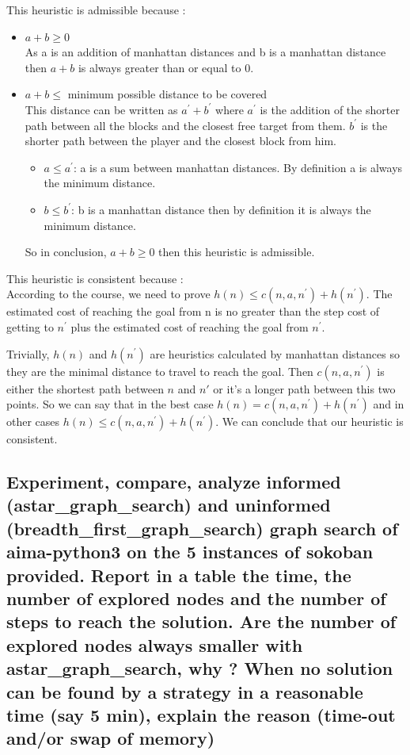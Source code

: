 \documentclass{article}
\begin{document}
This heuristic is admissible because :
\begin{itemize}
\item{$a + b \ge 0 $}\\
As a is an addition of manhattan distances and b is a manhattan distance then $a + b$ is always greater than or equal to 0.
\item{$a + b \le $ minimum possible distance to be covered}\\
This distance can be written as $a^{'} + b^{'}$ where $a^{'}$ is the addition of the shorter path between all the blocks and the closest free target from them. $b^{'}$ is the shorter path between the player and the closest block from him.
\begin{itemize}
\item{$a \le a^{'}$}: a is a sum between manhattan distances. By definition a is always the minimum distance.
\item{$b \le b^{'}$}: b is a manhattan distance then by definition it is always the minimum distance.
\end{itemize}
So in conclusion, $a + b \ge 0 $ then this heuristic is admissible. 
\end{itemize}
This heuristic is consistent because :\\
According to the course, we need to prove $h(n) \le c(n,a,n^{'}) + h(n^{'})$. The estimated cost of reaching the goal from n is no greater than the step cost of getting to $n^{'}$ plus the estimated cost of reaching the goal from $n^{'}$.

Trivially, $h(n)$ and $h(n^{'})$ are heuristics calculated by manhattan distances so they are the minimal distance to travel to reach the goal. Then $c(n,a,n^{'})$ is either the shortest path between $n$ and $n'$ or it's a longer path between this two points. So we can say that in the best case $h(n) = c(n,a,n^{'}) + h(n^{'})$ and in other cases $h(n) \le c(n,a,n^{'}) + h(n^{'})$. We can conclude that our heuristic is consistent.

\subsection*{Experiment, compare, analyze informed (astar\_graph\_search) and uninformed (breadth\_first\_graph\_search) graph search of aima-python3 on the 5 instances of sokoban provided. Report in a table the time, the number of explored nodes and the number of steps to reach the solution. Are the number of explored nodes always smaller with astar\_graph\_search, why ?
When no solution can be found by a strategy in a reasonable time (say 5 min), explain the reason (time-out and/or swap of memory)}
\end{document}
